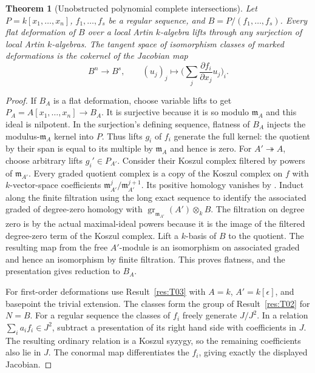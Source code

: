 \documentclass[11pt,oneside,openany]{book}
\newtheorem{theorem}{Theorem}[chapter]
\theoremstyle{definition}
\theoremstyle{remark}
\begin{document}
\begin{theorem}[Unobstructed polynomial complete intersections]\label{res:T04}
Let \(P=k[x_1,\ldots,x_n]\), \(f_1,\ldots,f_s\) be a regular
sequence, and \(B=P/(f_1,\ldots,f_s)\).
Every flat deformation of \(B\) over a local Artin \(k\)-algebra
lifts through any surjection of local Artin \(k\)-algebras.
The tangent space of isomorphism classes of marked deformations
is the cokernel of the Jacobian map
\[
 B^n \longrightarrow B^s,\qquad
 (u_j)_j\longmapsto
 \Big(\sum_j \frac{\partial f_i}{\partial x_j}u_j\Big)_i .
\]
\end{theorem}
\begin{proof}
If \(B_A\) is a flat deformation, choose variable lifts to get
\(P_A=A[x_1,\ldots,x_n]\to B_A\). It is surjective because it is
so modulo \(\mathfrak m_A\) and this ideal is nilpotent. In the
surjection's defining sequence, flatness of \(B_A\) injects
the modulus-\(\mathfrak m_A\) kernel into \(P\).
Thus lifts \(g_i\) of \(f_i\) generate the full kernel:
the quotient by their span is equal to its multiple by
\(\mathfrak m_A\) and hence is zero. For \(A'\twoheadrightarrow A\),
choose arbitrary lifts \(g_i'\in P_{A'}\). Consider their Koszul
complex filtered by powers of \(\mathfrak m_{A'}\).
Every graded quotient complex is a copy of the Koszul complex on
\(f\) with \(k\)-vector-space coefficients \(\mathfrak m_{A'}^j/
\mathfrak m_{A'}^{j+1}\). Its positive homology vanishes by
\cite[RK-07]{core}. Induct along the finite filtration using the
long exact sequence to identify the associated graded of degree-zero
homology with
\(\operatorname{gr}_{\mathfrak m_{A'}}(A')\otimes_k B\).
The filtration on degree zero is by the actual maximal-ideal powers
because it is the image of the filtered degree-zero term of the
Koszul complex. Lift a \(k\)-basis of \(B\) to the quotient.
The resulting map from the free \(A'\)-module is an isomorphism
on associated graded and hence an isomorphism by finite filtration.
This proves flatness, and the presentation gives reduction to \(B_A\).

For first-order deformations use Result~\ref{res:T03} with
\(A=k\), \(A'=k[\epsilon]\), and basepoint the trivial extension.
The classes form the group of Result~\ref{res:T02} for \(N=B\).
For a regular sequence the classes of \(f_i\) freely generate
\(J/J^2\). In a relation \(\sum_i a_i f_i\in J^2\), subtract
a presentation of its right hand side with coefficients in \(J\).
The resulting ordinary relation is a Koszul syzygy, so the remaining
coefficients also lie in \(J\).
The conormal map differentiates the \(f_i\), giving exactly
the displayed Jacobian.
\end{proof}
\end{document}
